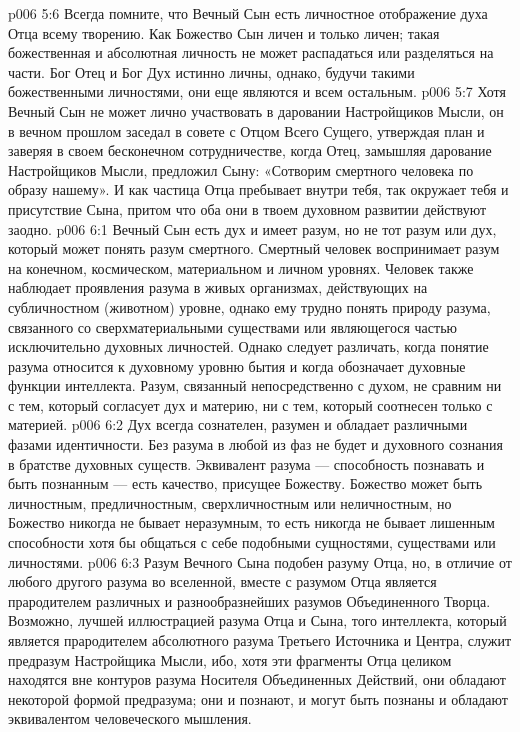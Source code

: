 \vs p006 5:6 Всегда помните, что Вечный Сын есть личностное отображение духа Отца всему творению. Как Божество Сын личен и только личен; такая божественная и абсолютная личность не может распадаться или разделяться на части. Бог Отец и Бог Дух истинно личны, однако, будучи такими божественными личностями, они еще являются и всем остальным.
\vs p006 5:7 Хотя Вечный Сын не может лично участвовать в даровании Настройщиков Мысли, он в вечном прошлом заседал в совете с Отцом Всего Сущего, утверждая план и заверяя в своем бесконечном сотрудничестве, когда Отец, замышляя дарование Настройщиков Мысли, предложил Сыну: «Сотворим смертного человека по образу нашему». И как частица Отца пребывает внутри тебя, так окружает тебя и присутствие Сына, притом что оба они в твоем духовном развитии действуют заодно.
\vs p006 6:1 Вечный Сын есть дух и имеет разум, но не тот разум или дух, который может понять разум смертного. Смертный человек воспринимает разум на конечном, космическом, материальном и личном уровнях. Человек также наблюдает проявления разума в живых организмах, действующих на субличностном (животном) уровне, однако ему трудно понять природу разума, связанного со сверхматериальными существами или являющегося частью исключительно духовных личностей. Однако следует различать, когда понятие разума относится к духовному уровню бытия и когда обозначает духовные функции интеллекта. Разум, связанный непосредственно с духом, не сравним ни с тем, который согласует дух и материю, ни с тем, который соотнесен только с материей.
\vs p006 6:2 Дух всегда сознателен, разумен и обладает различными фазами идентичности. Без разума в любой из фаз не будет и духовного сознания в братстве духовных существ. Эквивалент разума --- способность познавать и быть познанным --- есть качество, присущее Божеству. Божество может быть личностным, предличностным, сверхличностным или неличностным, но Божество никогда не бывает неразумным, то есть никогда не бывает лишенным способности хотя бы общаться с себе подобными сущностями, существами или личностями.
\vs p006 6:3 Разум Вечного Сына подобен разуму Отца, но, в отличие от любого другого разума во вселенной, вместе с разумом Отца является прародителем различных и разнообразнейших разумов Объединенного Творца. Возможно, лучшей иллюстрацией разума Отца и Сына, того интеллекта, который является прародителем абсолютного разума Третьего Источника и Центра, служит предразум Настройщика Мысли, ибо, хотя эти фрагменты Отца целиком находятся вне контуров разума Носителя Объединенных Действий, они обладают некоторой формой предразума; они и познают, и могут быть познаны и обладают эквивалентом человеческого мышления.
